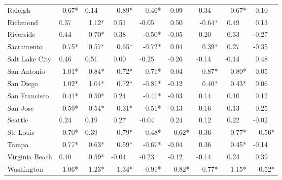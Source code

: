 \begin{tabular}{lrrrrrrrr}
	Raleigh        &  0.67* &  0.14~~ &   0.89* &  -0.46* &  0.09~~ &  0.34~~ &   0.67* & -0.10~~ \\
	Richmond       & 0.37~~ &   1.12* &  0.51~~ & -0.05~~ &  0.50~~ &  -0.64* &  0.49~~ &  0.13~~ \\
	Riverside      & 0.44~~ &   0.70* &  0.38~~ &  -0.50* & -0.05~~ &  0.20~~ &  0.33~~ & -0.27~~ \\
	Sacramento     &  0.75* &   0.57* &   0.65* &  -0.72* &  0.04~~ &   0.39* &  0.27~~ & -0.35~~ \\
	Salt Lake City & 0.46~~ &  0.51~~ &  0.00~~ & -0.25~~ & -0.26~~ & -0.14~~ & -0.14~~ &  0.48~~ \\
	San Antonio    &  1.01* &   0.84* &   0.72* &  -0.71* &  0.04~~ &   0.87* &   0.80* &  0.05~~ \\
	San Diego      &  1.02* &   1.04* &   0.72* &  -0.81* & -0.12~~ &   0.40* &   0.43* &  0.06~~ \\
	San Francisco  &  0.41* &   0.50* &  0.24~~ &  -0.41* & -0.03~~ &  0.14~~ &  0.10~~ &  0.12~~ \\
	San Jose       &  0.59* &   0.54* &   0.31* &  -0.51* & -0.13~~ &  0.16~~ &  0.13~~ &  0.25~~ \\
	Seattle        & 0.24~~ &  0.19~~ &  0.27~~ & -0.04~~ &  0.24~~ &  0.12~~ &  0.22~~ & -0.02~~ \\
	St. Louis      &  0.70* &  0.39~~ &   0.79* &  -0.48* &   0.62* & -0.36~~ &   0.77* &  -0.56* \\
	Tampa          &  0.77* &   0.63* &   0.59* &  -0.67* & -0.04~~ &  0.36~~ &   0.45* & -0.14~~ \\
	Virginia Beach & 0.40~~ &   0.59* & -0.04~~ & -0.23~~ & -0.12~~ & -0.14~~ &  0.24~~ &  0.39~~ \\
	Washington     &  1.06* &   1.23* &   1.34* &  -0.91* &   0.82* &  -0.77* &   1.15* &  -0.52* \\ \bottomrule
\end{tabular}
\normalsize